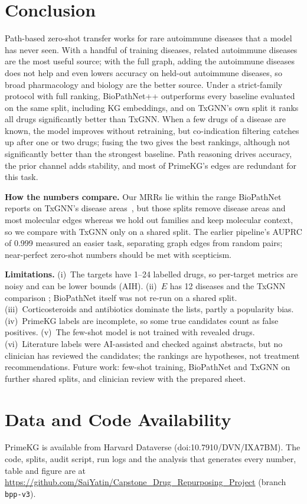 \documentclass{ieeeaccess}
\newcommand{\sysname}{BioPathNet++\xspace}
\begin{document}
\section{Conclusion}
\label{sec:conclusion}
Path-based zero-shot transfer works for rare autoimmune diseases that a model has never seen. With a handful of training diseases, related autoimmune diseases are the most useful source; with the full graph, adding the autoimmune diseases does not help and even lowers accuracy on held-out autoimmune diseases, so broad pharmacology and biology are the better source. Under a strict-family protocol with full ranking, \sysname outperforms every baseline evaluated on the same split, including KG embeddings, and on TxGNN's own split it ranks all drugs significantly better than TxGNN. When a few drugs of a disease are known, the model improves without retraining, but co-indication filtering catches up after one or two drugs; fusing the two gives the best rankings, although not significantly better than the strongest baseline. Path reasoning drives accuracy, the prior channel adds stability, and most of PrimeKG's edges are redundant for this task.

\textbf{How the numbers compare.} Our MRRs lie within the range BioPathNet reports on TxGNN's disease areas~\cite{hu2026biopathnet}, but those splits remove disease areas and most molecular edges whereas we hold out families and keep molecular context, so we compare with TxGNN only on a shared split. The earlier pipeline's AUPRC of 0.999 measured an easier task, separating graph edges from random pairs; near-perfect zero-shot numbers should be met with scepticism.

\textbf{Limitations.} (i)~The targets have 1--24 labelled drugs, so per-target metrics are noisy and can be lower bounds (AIH). (ii)~$E$ has 12 diseases and the TxGNN comparison \TxhN; BioPathNet itself was not re-run on a shared split. (iii)~Corticosteroids and antibiotics dominate the lists, partly a popularity bias. (iv)~PrimeKG labels are incomplete, so some true candidates count as false positives. (v)~The few-shot model is not trained with revealed drugs. (vi)~Literature labels were AI-assisted and checked against abstracts, but no clinician has reviewed the candidates; the rankings are hypotheses, not treatment recommendations. Future work: few-shot training, BioPathNet and TxGNN on further shared splits, and clinician review with the prepared sheet.

\section*{Data and Code Availability}
{\raggedright PrimeKG is available from Harvard Dataverse (doi:10.7910/DVN/IXA7BM). The code, splits, audit script, run logs and the analysis that generates every number, table and figure are at \url{https://github.com/SaiYatin/Capstone_Drug_Repurposing_Project} (branch \texttt{bpp-v3}).\par}
\end{document}
